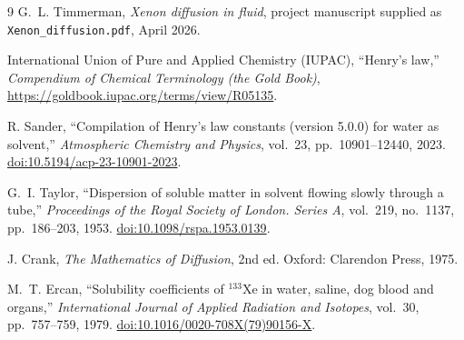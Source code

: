 \documentclass[11pt]{article}
\begin{document}
\begin{thebibliography}{9}
G.~L. Timmerman,
\emph{Xenon diffusion in fluid},
project manuscript supplied as \texttt{Xenon\_diffusion.pdf}, April 2026.

International Union of Pure and Applied Chemistry (IUPAC),
``Henry's law,'' \emph{Compendium of Chemical Terminology (the Gold Book)},
\href{https://goldbook.iupac.org/terms/view/R05135}
     {https://goldbook.iupac.org/terms/view/R05135}.

R. Sander,
``Compilation of Henry's law constants (version 5.0.0) for water as solvent,''
\emph{Atmospheric Chemistry and Physics}, vol.~23, pp.~10901--12440, 2023.
\href{https://doi.org/10.5194/acp-23-10901-2023}
     {doi:10.5194/acp-23-10901-2023}.

G.~I. Taylor,
``Dispersion of soluble matter in solvent flowing slowly through a tube,''
\emph{Proceedings of the Royal Society of London. Series A},
vol.~219, no.~1137, pp.~186--203, 1953.
\href{https://doi.org/10.1098/rspa.1953.0139}
     {doi:10.1098/rspa.1953.0139}.

J. Crank,
\emph{The Mathematics of Diffusion}, 2nd ed.
Oxford: Clarendon Press, 1975.

M.~T. Ercan,
``Solubility coefficients of \({}^{133}\mathrm{Xe}\) in water, saline, dog
blood and organs,'' \emph{International Journal of Applied Radiation and
Isotopes}, vol.~30, pp.~757--759, 1979.
\href{https://doi.org/10.1016/0020-708X(79)90156-X}
     {doi:10.1016/0020-708X(79)90156-X}.
\end{thebibliography}
\end{document}
